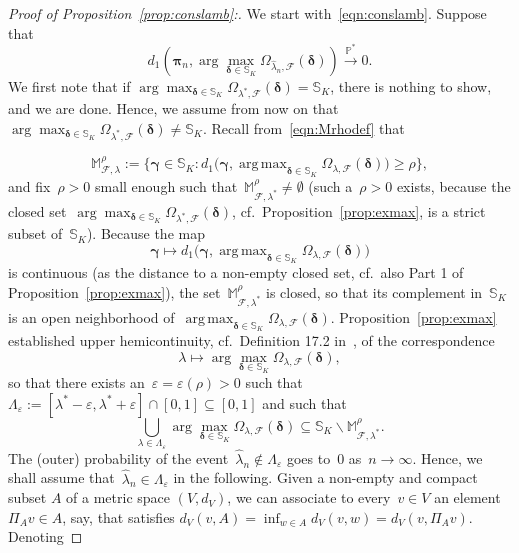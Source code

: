 \documentclass[11pt, a4paper]{article}
\DeclareMathOperator*{\argmax}{arg\,max}
\newcommand{\cps}{\xrightarrow{\mathbb{P}^*}}
\theoremstyle{definition}
\begin{document}
\begin{proof}[Proof of Proposition~\ref{prop:conslamb}:]
We start with~\eqref{eqn:conslamb}. Suppose that~$$d_1\left( \bm{\pi}_n, \arg\max_{\bm{\delta} \in \mathbb{S}_K} \Omega_{  \hat{\lambda}_n, \mathcal{F}}(\bm{\delta})\right) \cps 0.$$
We first note that if $\arg\max_{\bm{\delta} \in \mathbb{S}_K} \Omega_{ \lambda^*, \mathcal{F}}(\bm{\delta}) = \mathbb{S}_K$, there is nothing to show, and we are done. Hence, we assume from now on that $\arg\max_{\bm{\delta} \in \mathbb{S}_K} \Omega_{ \lambda^*, \mathcal{F}}(\bm{\delta}) \neq \mathbb{S}_K$. Recall from~\eqref{eqn:Mrhodef} that

%
\begin{equation*}
\mathbb{M}_{\mathcal{F}, \lambda}^{\rho} := \big\{\bm{\gamma} \in \mathbb{S}_K : d_1\big( 
\bm{\gamma},
\argmax_{\bm{\delta} \in \mathbb{S}_K} \Omega_{\lambda, \mathcal{F}}(\bm{\delta})
\big) \geq \rho
\big \},
\end{equation*}
%
and fix~$\rho > 0$ small enough such that~$\mathbb{M}_{\mathcal{F}, \lambda^*}^{\rho} \neq \emptyset$ (such a~$\rho > 0$ exists, because the closed set~$\arg\max_{\bm{\delta} \in \mathbb{S}_K} \Omega_{ \lambda^*, \mathcal{F}}(\bm{\delta})$, cf.~Proposition~\ref{prop:exmax}, is a strict subset of~$\mathbb{S}_K$). Because the map~$$\bm{\gamma} \mapsto d_1\big( 
\bm{\gamma},
\argmax_{\bm{\delta} \in \mathbb{S}_K} \Omega_{\lambda, \mathcal{F}}(\bm{\delta})
\big)$$ is continuous (as the distance to a non-empty closed set, cf.~also Part 1 of Proposition~\ref{prop:exmax}), the set~$\mathbb{M}_{\mathcal{F}, \lambda^*}^{\rho}$ is closed, so that its complement in~$\mathbb{S}_K$ is an open neighborhood of~$\argmax_{\bm{\delta} \in \mathbb{S}_K} \Omega_{\lambda, \mathcal{F}}(\bm{\delta})$. Proposition~\ref{prop:exmax} established upper hemicontinuity, cf.~Definition 17.2 in~\cite{hhg}, of the correspondence~$$\lambda \mapsto 	\arg\max_{\bm{\delta} \in \mathbb{S}_K} \Omega_{  \lambda, \mathcal{F}}(\bm{\delta}),$$ so that there exists an~$\varepsilon = \varepsilon(\rho) > 0$ such that~$\Lambda_{\varepsilon} := [\lambda^* - \varepsilon, \lambda^* + \varepsilon] \cap [0, 1] \subseteq [0, 1]$ and such that
%
\begin{equation}\label{eqn:incluuhem}
\bigcup_{\lambda \in \Lambda_{\varepsilon}} \arg\max_{\bm{\delta} \in \mathbb{S}_K} \Omega_{  \lambda, \mathcal{F}}(\bm{\delta}) \subseteq \mathbb{S}_K \backslash \mathbb{M}_{\mathcal{F}, \lambda^*}^{\rho}.
\end{equation}
%
The (outer) probability of the event~$\hat{\lambda}_n \notin \Lambda_{\varepsilon}$ goes to~$0$ as~$n \to \infty$. Hence, we shall assume that~$\hat{\lambda}_n \in \Lambda_{\varepsilon}$ in the following. Given a non-empty and compact subset $A$ of a metric space $(V, d_V)$, we can associate to every~$v \in V$ an element $\Pi_A v \in A$, say, that satisfies $d_V(v, A) = \inf_{w \in A} d_V(v, w) = d_V(v, \Pi_A v)$. Denoting

\end{proof}
\end{document}
